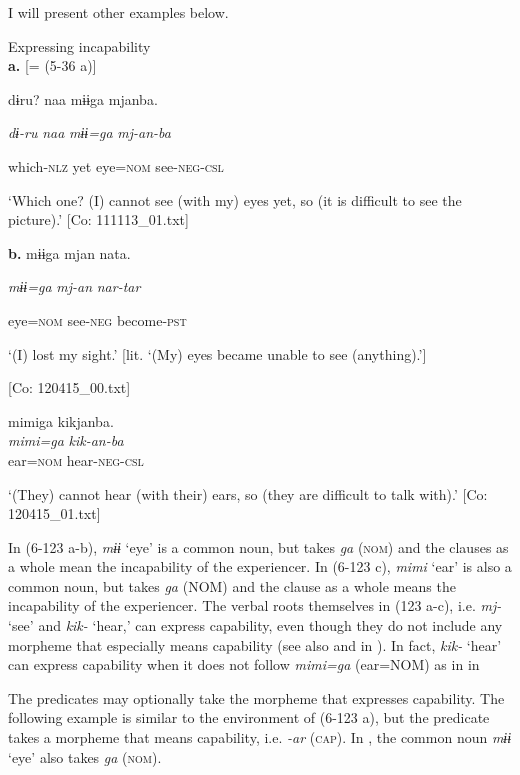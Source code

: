   I will present other examples below.

\ea\label{ex:6-123}
 Expressing incapability\\

  \textbf{a.}  [= (5-36 a)]

{\TM}
\gll dɨru?  naa  mɨɨga  mjanba.

      \textit{dɨ-ru}  \textit{naa}  \textit{mɨɨ=ga}  \textit{mj-an{}-ba}

      which-\textsc{nlz}  yet  eye=\textsc{nom}  see-\textsc{neg}-\textsc{csl}

\glt ‘Which one? (I) cannot see (with my) eyes yet, so (it is difficult to see the picture).’ [Co: 111113\_01.txt]
\z

  \textbf{b.}  {\TM}  mɨɨga  mjan  nata.

      \textit{mɨɨ=ga}  \textit{mj-an}  \textit{nar-tar}

      eye=\textsc{nom}  see-\textsc{neg}  become-\textsc{pst}

\glt ‘(I) lost my sight.’ [lit. ‘(My) eyes became unable to see (anything).’]

      [Co: 120415\_00.txt]
\z

 \ex {\TM}  mimiga  kikjanba.\\
\gll \textit{mimi=ga}  \textit{kik-an{}-ba}\\

      ear=\textsc{nom}  hear-\textsc{neg}-\textsc{csl}

\glt ‘(They) cannot hear (with their) ears, so (they are difficult to talk with).’ [Co: 120415\_01.txt]
\z

In (6-123 a-b), \textit{mɨɨ} ‘eye’ is a common noun, but takes \textit{ga} (\textsc{nom}) and the clauses as a whole mean the incapability of the experiencer. In (6-123 c), \textit{mimi} ‘ear’ is also a common noun, but takes \textit{ga} (NOM) and the clause as a whole means the incapability of the experiencer. The verbal roots themselves in (123 a-c), i.e. \textit{mj-} ‘see’ and \textit{kik-} ‘hear,’ can express capability, even though they do not include any morpheme that especially means capability (see also  and  in ). In fact, \textit{kik-} ‘hear’ can express capability when it does not follow \textit{mimi=ga} (ear=NOM) as in  in 

The predicates may optionally take the morpheme that expresses capability. The following example is similar to the environment of (6-123 a), but the predicate takes a morpheme that means capability, i.e. \textit{{}-ar} (\textsc{cap}). In , the common noun \textit{mɨɨ} ‘eye’ also takes \textit{ga} (\textsc{nom}).

